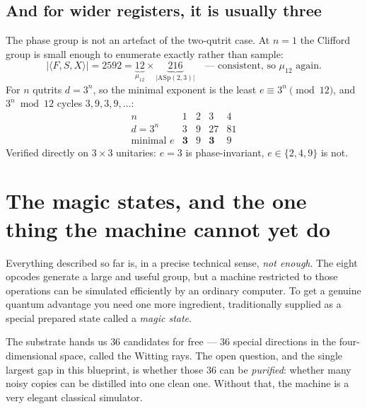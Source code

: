 \subsection{And for wider registers, it is usually three}

\begin{spec}[Pass 2791]
The phase group is not an artefact of the two-qutrit case. At $n=1$ the Clifford group is
small enough to enumerate exactly rather than sample:
\[
  |\langle F,S,X\rangle| = 2592 = \underbrace{12}_{\mu_{12}}\times
  \underbrace{216}_{|\mathrm{ASp}(2,3)|}\quad\text{--- consistent, so }\mu_{12}\text{ again.}
\]
For $n$ qutrits $d=3^n$, so the minimal exponent is the least $e\equiv 3^n \pmod{12}$, and
$3^n \bmod 12$ cycles $3,9,3,9,\dots$:
\[
\begin{array}{c|cccc}
n & 1 & 2 & 3 & 4\\\hline
d=3^n & 3 & 9 & 27 & 81\\
\text{minimal }e & \mathbf{3} & 9 & \mathbf{3} & 9
\end{array}
\]
Verified directly on $3\times3$ unitaries: $e=3$ is phase-invariant, $e\in\{2,4,9\}$ is not.
\end{spec}


\section{The magic states, and the one thing the machine cannot yet do}\label{sec:magic}

\begin{plain}
Everything described so far is, in a precise technical sense, \emph{not enough}. The
eight opcodes generate a large and useful group, but a machine restricted to those
operations can be simulated efficiently by an ordinary computer. To get a genuine quantum
advantage you need one more ingredient, traditionally supplied as a special prepared
state called a \emph{magic state}.

The substrate hands us $36$ candidates for free --- $36$ special directions in the
four-dimensional space, called the Witting rays. The open question, and the single
largest gap in this blueprint, is whether those $36$ can be \emph{purified}: whether many
noisy copies can be distilled into one clean one. Without that, the machine is a very
elegant classical simulator.
\end{plain}

